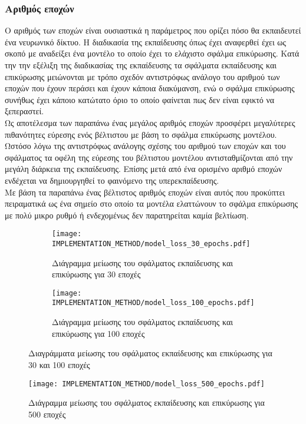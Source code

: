 \subsubsection{Αριθμός εποχών}
Ο αριθμός των εποχών είναι ουσιαστικά η παράμετρος που ορίζει πόσο θα εκπαιδευτεί ένα νευρωνικό δίκτυο. Η διαδικασία της εκπαίδευσης όπως έχει αναφερθεί έχει ως σκοπό με αναδείξει ένα μοντέλο το οποίο έχει το ελάχιστο σφάλμα επικύρωσης. Κατά την την εξέλιξη της διαδικασίας της εκπαίδευσης τα σφάλματα εκπαίδευσης και επικύρωσης μειώνονται με τρόπο σχεδόν αντιστρόφως ανάλογο του αριθμού των εποχών που έχουν περάσει και έχουν κάποια διακύμανση, ενώ ο σφάλμα επικύρωσης συνήθως έχει κάποιο κατώτατο όριο το οποίο φαίνεται πως δεν είναι εφικτό να ξεπεραστεί.\\

Ως αποτέλεσμα των παραπάνω ένας μεγάλος αριθμός εποχών προσφέρει μεγαλύτερες πιθανότητες εύρεσης ενός βέλτιστου με βάση το σφάλμα επικύρωσης μοντέλου. Ωστόσο λόγω της αντιστρόφως ανάλογης σχέσης του αριθμού των εποχών και του σφάλματος τα οφέλη της εύρεσης του βέλτιστου μοντέλου αντισταθμίζονται από την μεγάλη διάρκεια της εκπαίδευσης. Επίσης μετά από ένα ορισμένο αριθμό εποχών ενδέχεται να δημιουργηθεί το φαινόμενο της υπερεκπαίδευσης.\\

Με βάση τα παραπάνω ένας βέλτιστος αριθμός εποχών είναι αυτός που προκύπτει πειραματικά ως ένα σημείο στο οποίο τα μοντέλα ελαττώνουν το σφάλμα επικύρωσης με πολύ μικρο ρυθμό ή ενδεχομένως δεν παρατηρείται καμία βελτίωση.

\begin{figure}[H]
    \begin{subfigure}{0.5\textwidth}
        \texttt{[image: IMPLEMENTATION\_METHOD/model\_loss\_30\_epochs.pdf]}
        \caption{Διάγραμμα μείωσης του σφάλματος εκπαίδευσης και επικύρωσης για 30 εποχές}
        \label{fig:epochs30}
    \end{subfigure}
    \begin{subfigure}{0.5\textwidth}
        \texttt{[image: IMPLEMENTATION\_METHOD/model\_loss\_100\_epochs.pdf]}
        \caption{Διάγραμμα μείωσης του σφάλματος εκπαίδευσης και επικύρωσης για 100 εποχές}
        \label{fig:epochs100}
    \end{subfigure}
    \caption{Διαγράμματα μείωσης του σφάλματος εκπαίδευσης και επικύρωσης για 30 και 100 εποχές}
\end{figure}
\begin{figure}[H]
    \centering
    \texttt{[image: IMPLEMENTATION\_METHOD/model\_loss\_500\_epochs.pdf]}
    \caption{Διάγραμμα μείωσης του σφάλματος εκπαίδευσης και επικύρωσης για 500 εποχές}
    \label{fig:epochs500}
\end{figure}

